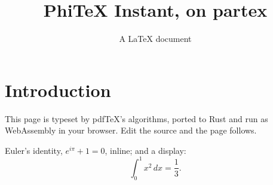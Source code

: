 \documentclass{article}
\title{PhiTeX Instant, on partex}
\author{A LaTeX document}
\begin{document}
\maketitle

\section{Introduction}
This page is typeset by pdfTeX's algorithms, ported to Rust and run as
WebAssembly in your browser. Edit the source and the page follows.

Euler's identity, $e^{i\pi} + 1 = 0$, inline; and a display:
\begin{equation}
  \int_0^1 x^2\,dx = \frac{1}{3}.
\end{equation}


\end{document}

